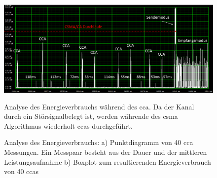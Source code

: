 \begin{figure}[bth]
        \myfloatalign
        {\includegraphics[width=1\linewidth]{gfx/CCA_Stoerer_Power}} 
        \caption[Energiemessung CCA]{Analyse des Energieverbrauchs während des \acs{cca}. Da der Kanal durch ein Störsignalbelegt ist, werden währende des \acs{csma} Algorithmus wiederholt \acsp{cca} durchgeführt.}\label{fig:power_cca}
\end{figure}

\begin{figure}[bth]
        \myfloatalign
        \caption[Energiemessung CCA]{Analyse des Energieverbrauchs: a) Punktdiagramm von 40 \acs{cca} Messungen. Ein Messpaar besteht aus der Dauer und der mittleren Leistungsaufnahme b) Boxplot zum resultierenden Energieverbrauch von 40 \acsp{cca}}\label{fig:diag_cca_dauer_leistung}
\end{figure}

